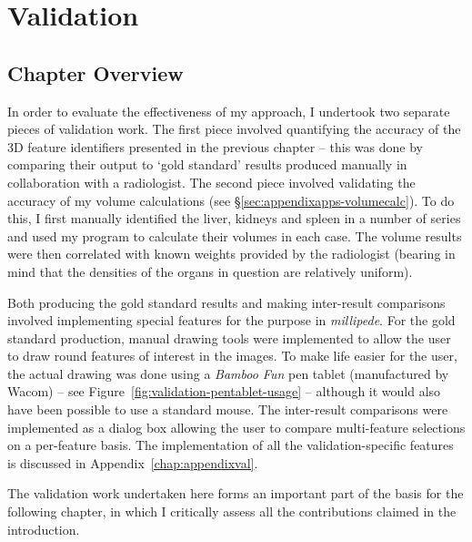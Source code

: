 \chapter{Validation}
\label{chap:validation}

\vspace{-\baselineskip}

\section{Chapter Overview}

In order to evaluate the effectiveness of my approach, I undertook two separate pieces of validation work. The first piece involved quantifying the accuracy of the 3D feature identifiers presented in the previous chapter -- this was done by comparing their output to `gold standard' results produced manually in collaboration with a radiologist. The second piece involved validating the accuracy of my volume calculations (see \S\ref{sec:appendixapps-volumecalc}). To do this, I first manually identified the liver, kidneys and spleen in a number of series and used my program to calculate their volumes in each case. The volume results were then correlated with known weights provided by the radiologist (bearing in mind that the densities of the organs in question are relatively uniform).

Both producing the gold standard results and making inter-result comparisons involved implementing special features for the purpose in \emph{millipede}. For the gold standard production, manual drawing tools were implemented to allow the user to draw round features of interest in the images. To make life easier for the user, the actual drawing was done using a \emph{Bamboo Fun} pen tablet (manufactured by Wacom) -- see Figure~\ref{fig:validation-pentablet-usage} -- although it would also have been possible to use a standard mouse. The inter-result comparisons were implemented as a dialog box allowing the user to compare multi-feature selections on a per-feature basis. The implementation of all the validation-specific features is discussed in Appendix~\ref{chap:appendixval}.

The validation work undertaken here forms an important part of the basis for the following chapter, in which I critically assess all the contributions claimed in the introduction.

